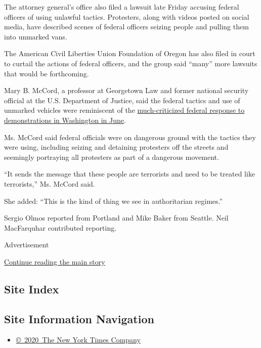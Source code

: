 The attorney general's office also filed a lawsuit late Friday accusing
federal officers of using unlawful tactics. Protesters, along with
videos posted on social media, have described scenes of federal officers
seizing people and pulling them into unmarked vans.

The American Civil Liberties Union Foundation of Oregon has also filed
in court to curtail the actions of federal officers, and the group said
``many'' more lawsuits that would be forthcoming.

Mary B. McCord, a professor at Georgetown Law and former national
security official at the U.S. Department of Justice, said the federal
tactics and use of unmarked vehicles were reminiscent of the
\href{https://www.nytimes3xbfgragh.onion/2020/06/02/us/politics/trump-walk-lafayette-square.html}{much-criticized
federal response to demonstrations in Washington in June}.

Ms. McCord said federal officials were on dangerous ground with the
tactics they were using, including seizing and detaining protesters off
the streets and seemingly portraying all protesters as part of a
dangerous movement.

``It sends the message that these people are terrorists and need to be
treated like terrorists,'' Ms. McCord said.

She added: ``This is the kind of thing we see in authoritarian
regimes.''

Sergio Olmos reported from Portland and Mike Baker from Seattle. Neil
MacFarquhar contributed reporting.

Advertisement

\protect\hyperlink{after-bottom}{Continue reading the main story}

\hypertarget{site-index}{%
\subsection{Site Index}\label{site-index}}

\hypertarget{site-information-navigation}{%
\subsection{Site Information
Navigation}\label{site-information-navigation}}

\begin{itemize}
\tightlist
\item
  \href{https://help.nytimes3xbfgragh.onion/hc/en-us/articles/115014792127-Copyright-notice}{©~2020~The
  New York Times Company}
\end{itemize}

